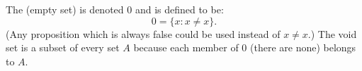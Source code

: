 The  (empty set) is denoted $0$ and is defined to be:
$$
0 = \{x : x \neq x\}.
$$
(Any proposition which is always false could be used instead of $x \neq x$.)
The void set is a subset of every set $A$ because each member of $0$ (there are none) belongs to $A$.
